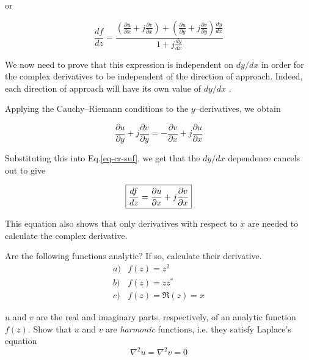 or

\begin{equation}
\frac{d f}{d z} = \frac{\left(\frac{\partial u}{\partial x}+j\frac{\partial
v}{\partial x}\right) +\left(\frac{\partial u}{\partial y}+j\frac{\partial
v}{\partial y}\right) \frac{d y}{d x}}{1 + j \frac{d y}{d x}} \label{eq-cr-suf}
\end{equation} 

We now need to prove that this expression is independent on $d y / d x$ in order
for the complex derivatives to be independent of the direction of approach. Indeed, each direction of approach will have its own value of $d y / d x$ .

Applying the Cauchy--Riemann conditions to the $y$--derivatives, we obtain

\begin{equation}
\frac{\partial u}{\partial y}+j\frac{\partial v}{\partial y} = -\frac{\partial
v}{\partial x}+j\frac{\partial u}{\partial x}
\end{equation}

Substituting this into Eq.\ref{eq-cr-suf}, we get that the $d y / d x$
dependence cancels out to give

\begin{equation}
\fbox{$\displaystyle
\frac{d f}{d z} = \frac{\partial u}{\partial x}+j\frac{\partial v}{\partial x}
$}
\end{equation} 

This equation also shows that only derivatives with respect to $x$ are needed to
calculate the complex derivative.

\begin{sidebar}
\begin{ex}
Are the following functions analytic? If so, calculate their derivative.
$$\begin{array}{lcll}a) & f(z)=z^2 \\b) & f(z)=z z^* \\c) & f(z)= \Re(z)=x \end{array}$$
\end{ex}
\end{sidebar}

\begin{sidebar}
\begin{ex} \label{ex-harmonic}
$u$ and $v$ are the real and imaginary parts, respectively, of an analytic function $f(z)$. Show that $u$ and $v$ are \emph{harmonic} functions, i.e. they satisfy Laplace's equation
$$\nabla^2 u = \nabla^2 v = 0$$
\end{ex}
\end{sidebar}

